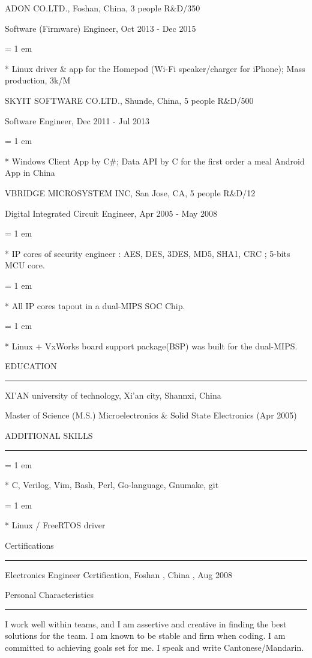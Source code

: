 { \medbreak } { \FFdd
ADON CO.LTD., Foshan, China, 3 people R\&D/350
}

{ \FFee
Software (Firmware) Engineer, Oct 2013 - Dec 2015
}
{ \parindent = 1 em \item{*}
 Linux driver \& app for the Homepod (Wi-Fi speaker/charger for iPhone); Mass production, 3k/M
 }

{ \medbreak } { \FFdd
SKYIT SOFTWARE CO.LTD., Shunde, China, 5 people R\&D/500
}

{ \FFee
Software Engineer, Dec 2011 - Jul 2013
}
{ \parindent = 1 em \item{*}
 Windows Client App by C\#; Data API by C for the first order a meal Android App in China
 }

{ \medbreak } { \FFdd
VBRIDGE MICROSYSTEM INC, San Jose, CA, 5 people R\&D/12
}

{ \FFee
Digital Integrated Circuit Engineer, Apr 2005 - May 2008
}
{ \parindent = 1 em \item{*}
 IP cores of security engineer :
 AES, DES, 3DES, MD5, SHA1, CRC ;
 5-bits MCU core.
 }
{ \parindent = 1 em \item{*}
All IP cores tapout in a dual-MIPS SOC Chip.
 }
{ \parindent = 1 em \item{*}
Linux + VxWorks board support package(BSP) was built for the dual-MIPS.
 }

{ \medbreak } { \FFdd
EDUCATION
}
{ \smallbreak } {\par\noindent\hrule} { \smallbreak }
XI'AN university of technology, Xi'an city, Shannxi, China

{ \FFee
Master of Science (M.S.) Microelectronics \& Solid State Electronics (Apr 2005)
}

{ \medbreak } { \FFdd
ADDITIONAL SKILLS
}
{ \smallbreak } {\par\noindent\hrule} { \smallbreak }
{ \parindent = 1 em \item{*}
 C, Verilog, Vim, Bash, Perl, Go-language, Gnumake, git
 }
{ \parindent = 1 em \item{*}
 Linux / FreeRTOS driver
 }

{ \medbreak } { \FFdd
Certifications
}
{ \smallbreak } {\par\noindent\hrule} { \smallbreak }
Electronics Engineer Certification, Foshan , China , Aug 2008

{ \medbreak } { \FFdd
Personal Characteristics
}
{ \smallbreak } {\par\noindent\hrule} { \smallbreak }
I work well within teams, and I am assertive and creative
    in finding the best solutions for the team.
I am known to be stable and firm when coding.
I am committed to achieving goals set for me.
I speak and write
Cantonese/Mandarin.


